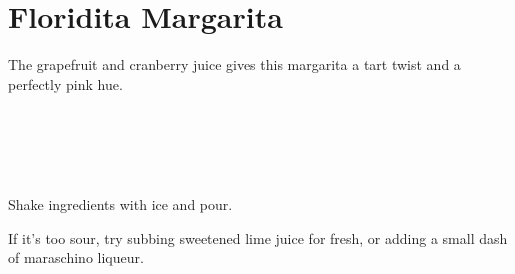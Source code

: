 \section[Floridita Margarita]{
    Floridita Margarita
}

\begin{recipestats}[
        servings=1,
        preptime=5 \minute,
        original=\citefield{cointreauFloridita}{shorttitle}~\cite{cointreauFloridita},
    ]
\end{recipestats}

\begin{recipeabstract}
    The grapefruit and cranberry juice gives this margarita a tart twist and
    a perfectly pink hue.
\end{recipeabstract}

\begin{ingredientcolumns}
    \begin{ingredientblock}
        \\
        \\
    \end{ingredientblock}
    \begin{ingredientblock}
        \\
    \end{ingredientblock}
\end{ingredientcolumns}

\begin{preparation}
\item Shake ingredients with ice and pour.
\end{preparation}

\begin{variation}
\item If it's too sour, try subbing sweetened lime juice for fresh, or adding
    a small dash of maraschino liqueur.
\end{variation}

\recipeend%
